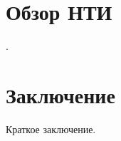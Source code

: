 \documentclass{gostcheck-vkr}
\begin{document}
\section{Обзор НТИ}
\cite{foreign01, foreign02, ru01}.
\section{Заключение}
Краткое заключение.
\end{document}
